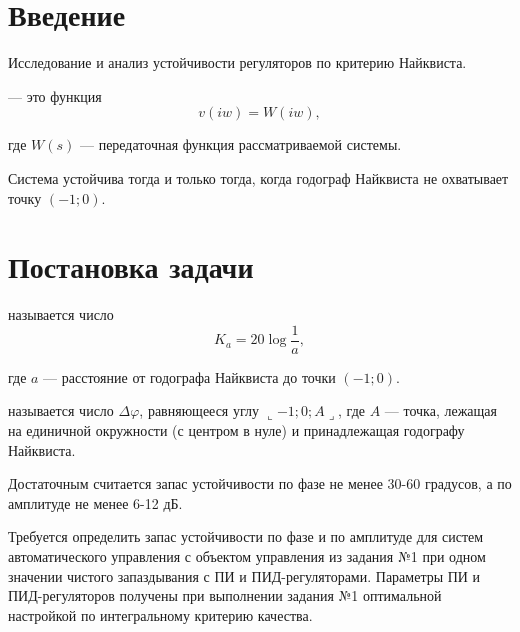 \section{Введение}
	\begin{goal}
		Исследование и анализ устойчивости регуляторов по критерию Найквиста.
	\end{goal}
	
	\begin{definition}
		 --- это функция
		\[v (iw) = W(iw),\]
		
		где $W(s)$ --- передаточная функция рассматриваемой системы.		
	\end{definition}
	
	\begin{criteria}
		Система устойчива тогда и только тогда, когда годограф Найквиста не охватывает точку $(-1; 0)$.
	\end{criteria}
\section{Постановка задачи}
	\begin{definition}
		 называется число
		\[K_a = 20 \log \frac{1}{a},\]
		
		где $a$ --- расстояние от годографа Найквиста до точки $(-1; 0)$.
	\end{definition}

	\begin{definition}
		 называется число $\Delta \varphi$, равняющееся углу $\llcorner -1;0;A \lrcorner$, где $A$ --- точка, лежащая на единичной окружности (с центром в нуле) и принадлежащая годографу Найквиста.
	\end{definition}

	\begin{remark}
		Достаточным считается запас устойчивости по фазе не менее 30-60 градусов, а по амплитуде не менее 6-12 дБ.
	\end{remark}

	\begin{remark}
		Требуется определить запас устойчивости по фазе и по амплитуде для систем автоматического управления с объектом управления из задания №1 при
		одном значении чистого запаздывания с ПИ и ПИД-регуляторами. Параметры ПИ и ПИД-регуляторов получены при выполнении задания №1 оптимальной
		настройкой по интегральному критерию качества.
	\end{remark}
